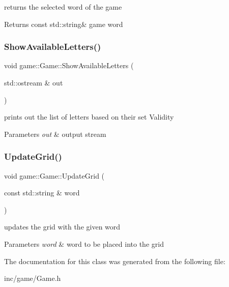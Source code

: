 returns the selected word of the game 

\begin{DoxyReturn}{Returns}
const std\+::string\& game word 
\end{DoxyReturn}
\mbox{\label{classgame_1_1Game_a156ae4dc99b8adb87a83d2c72ab24285}} 
\subsubsection{\texorpdfstring{Show\+Available\+Letters()}{ShowAvailableLetters()}}
{\footnotesize\ttfamily void game\+::\+Game\+::\+Show\+Available\+Letters (\begin{DoxyParamCaption}\item[{std\+::ostream \&}]{out }\end{DoxyParamCaption})}



prints out the list of letters based on their set Validity 


\begin{DoxyParams}{Parameters}
{\em out} & output stream \\
\hline
\end{DoxyParams}
\mbox{\label{classgame_1_1Game_a7785bad3273c5c3be55ad44fbe78b117}} 
\subsubsection{\texorpdfstring{Update\+Grid()}{UpdateGrid()}}
{\footnotesize\ttfamily void game\+::\+Game\+::\+Update\+Grid (\begin{DoxyParamCaption}\item[{const std\+::string \&}]{word }\end{DoxyParamCaption})}



updates the grid with the given word 


\begin{DoxyParams}{Parameters}
{\em word} & word to be placed into the grid \\
\hline
\end{DoxyParams}


The documentation for this class was generated from the following file\+:\begin{DoxyCompactItemize}
\item 
inc/game/Game.\+h\end{DoxyCompactItemize}
